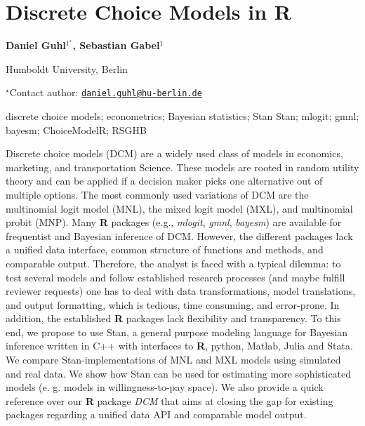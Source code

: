 \documentclass[\main/boa.tex]{subfiles}
\begin{document}
\pagestyle{empty}

\section{Discrete Choice Models in R}

\begin{center}
  {\bf Daniel Guhl$^{1^\star}$, Sebastian Gabel$^{1}$}
\end{center}

\vskip 0.3cm

\begin{affiliations}
\begin{enumerate}
\begin{minipage}{0.915\textwidth}
\centering
\item Humboldt University, Berlin \\[-2pt]
\end{minipage}
\end{enumerate}
$^\star$Contact author: \href{mailto:daniel.guhl@hu-berlin.de}{\nolinkurl{daniel.guhl@hu-berlin.de}}\\
\end{affiliations}

\vskip 0.5cm

\begin{minipage}{0.915\textwidth}
\keywords discrete choice models; econometrics; Bayesian statistics; Stan
\packages Stan; mlogit; gmnl; bayesm; ChoiceModelR; RSGHB
\end{minipage}

\vskip 0.8cm

Discrete choice models (DCM) are a widely used class of models in
economics, marketing, and transportation Science. These models are
rooted in random utility theory and can be applied if a decision maker
picks one alternative out of multiple options. The most commonly used
variations of DCM are the multinomial logit model (MNL), the mixed logit
model (MXL), and multinomial probit (MNP). Many \textbf{R} packages
(e.g., \emph{mlogit}, \emph{gmnl}, \emph{bayesm}) are available for
frequentist and Bayesian inference of DCM. However, the different
packages lack a unified data interface, common structure of functions
and methods, and comparable output. Therefore, the analyst is faced with
a typical dilemma: to test several models and follow established
research processes (and maybe fulfill reviewer requests) one has to deal
with data transformations, model translations, and output formatting,
which is tedious, time consuming, and error-prone. In addition, the
established \textbf{R} packages lack flexibility and transparency. To
this end, we propose to use Stan, a general purpose modeling language
for Bayesian inference written in C++ with interfaces to \textbf{R},
python, Matlab, Julia and Stata. We compare Stan-implementations of MNL
and MXL models using simulated and real data. We show how Stan can be
used for estimating more sophisticated models (e. g. models in
willingness-to-pay space). We also provide a quick reference over our
\textbf{R} package \emph{DCM} that aims at closing the gap for existing
packages regarding a unified data API and comparable model output.
\end{document}
